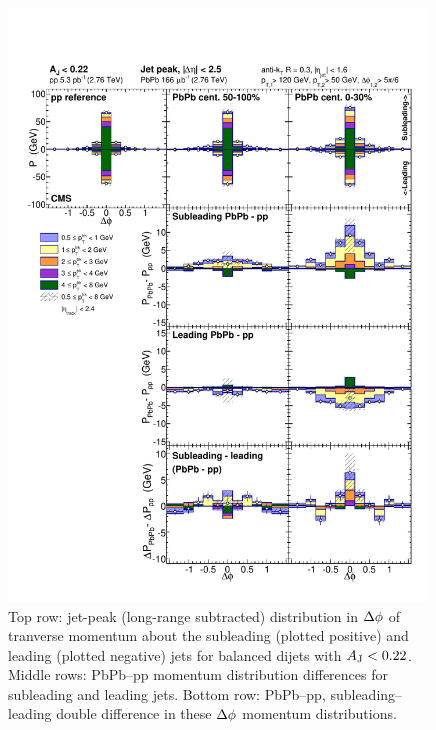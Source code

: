 \begin{figure}[hbt]
\begin{center} 
\includegraphics[width=0.99\textwidth]{figures/Results/Missing_pT_JetRelated_Aj0_Aj22.pdf}
\caption[Jet peak subleading-to-leading momentum balance for balanced dijets]{Top row:  jet-peak (long-range subtracted) distribution in $\protect\Delta\phi$ of tranverse momentum about the subleading (plotted positive) and leading (plotted negative) jets for balanced dijets with $A_{\rm J} < 0.22$.  Middle rows:  PbPb--pp momentum distribution differences for subleading and leading jets.  Bottom row:  PbPb--pp, subleading--leading double difference in these $\protect\Delta\phi$ momentum distributions.}
\label{fig:MpT_jetrelated_Aj0_Aj22} 
\end{center} 
\end{figure} 

